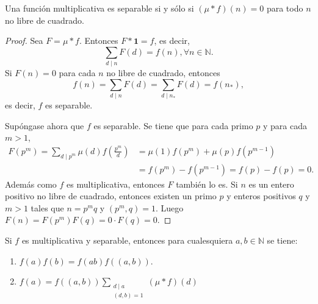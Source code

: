\begin{lemma}
Una función multiplicativa es separable si y sólo si $(\mu * f)(n)=0$ para todo $n$ no libre de cuadrado.
\end{lemma}
\begin{proof}
Sea $F=\mu * f$. Entonces $F*\mathbf{1}=f$, es decir,
\begin{equation*}
    \sum_{d \mid n} F(d) = f(n), \forall n \in \mathbb{N}.
\end{equation*}
Si $F(n)=0$ para cada $n$ no libre de cuadrado, entonces
\begin{equation*}
    f(n) = \sum_{d \mid n} F(d) = \sum_{d \mid n_*} F(d) = f(n_*),
\end{equation*}
es decir, $f$ es separable.
\bigskip

Supóngase ahora que $f$ es separable. Se tiene que para cada primo $p$ y para cada $m>1$,
\begin{align*}
    F(p^m) = \sum_{d \mid p^m} \mu(d) f \left( \frac{p^m}{d} \right) &= \mu(1)f(p^m) + \mu(p)f(p^{m-1}) \\
                                                                     &= f(p^m) - f(p^{m-1}) = f(p) - f(p) = 0.
\end{align*}
Además como $f$ es multiplicativa, entonces $F$ también lo es. Si $n$ es un entero positivo no libre de cuadrado, entonces existen un primo $p$ y enteros positivos $q$ y $m>1$ tales que $n=p^m q$ y $(p^m,q)=1$. Luego $F(n)=F(p^m)F(q)=0 \cdot F(q)=0$.
\end{proof}

\begin{lemma}\label{lem:par0}
Si $f$ es multiplicativa y separable, entonces para cualesquiera $a,b \in \mathbb{N}$ se tiene:
\begin{enumerate}[label=\textnormal{(\roman*)}]
\item $f(a)f(b)=f(a b)f((a,b))$.
\item $\displaystyle f(a) = f((a,b)) \sum_{\substack{d \mid a \\ (d,b) = 1}} (\mu * f)(d)$
\end{enumerate}
\end{lemma}

